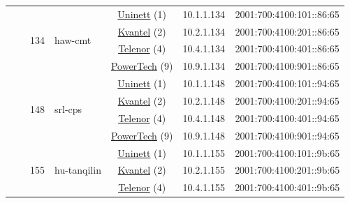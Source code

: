 \begin{small}
\begin{center}
\begin{longtable}{|c|c|c|c|c|c|c|c|}
  &  & \multirow{4}{*}{\tiny{134}} & \multicolumn{1}{|l|}{\multirow{4}{*}{\tiny{haw-cmt}}} & \multicolumn{2}{|c|}{\tiny{\href{https://www.uninett.no}{Uninett} (1)}} & \tiny{10.1.1.134} & \tiny{2001:700:4100:101::86:65} \\* \cline{5-5}\cline{6-6}\cline{7-7}\cline{8-8}
  &  &  &  & \multicolumn{2}{|c|}{\tiny{\href{http://kvantel.no}{Kvantel} (2)}} & \tiny{10.2.1.134} & \tiny{2001:700:4100:201::86:65} \\* \cline{5-5}\cline{6-6}\cline{7-7}\cline{8-8}
  &  &  &  & \multicolumn{2}{|c|}{\tiny{\href{https://www.telenor.no}{Telenor} (4)}} & \tiny{10.4.1.134} & \tiny{2001:700:4100:401::86:65} \\* \cline{5-5}\cline{6-6}\cline{7-7}\cline{8-8}
  &  &  &  & \multicolumn{2}{|c|}{\tiny{\href{http://www.powertech.no}{PowerTech} (9)}} & \tiny{10.9.1.134} & \tiny{2001:700:4100:901::86:65} \\* \cline{3-3}\cline{4-4}\cline{5-5}\cline{6-6}\cline{7-7}\cline{8-8}
  &  & \multirow{4}{*}{\tiny{148}} & \multicolumn{1}{|l|}{\multirow{4}{*}{\tiny{srl-cps}}} & \multicolumn{2}{|c|}{\tiny{\href{https://www.uninett.no}{Uninett} (1)}} & \tiny{10.1.1.148} & \tiny{2001:700:4100:101::94:65} \\* \cline{5-5}\cline{6-6}\cline{7-7}\cline{8-8}
  &  &  &  & \multicolumn{2}{|c|}{\tiny{\href{http://kvantel.no}{Kvantel} (2)}} & \tiny{10.2.1.148} & \tiny{2001:700:4100:201::94:65} \\* \cline{5-5}\cline{6-6}\cline{7-7}\cline{8-8}
  &  &  &  & \multicolumn{2}{|c|}{\tiny{\href{https://www.telenor.no}{Telenor} (4)}} & \tiny{10.4.1.148} & \tiny{2001:700:4100:401::94:65} \\* \cline{5-5}\cline{6-6}\cline{7-7}\cline{8-8}
  &  &  &  & \multicolumn{2}{|c|}{\tiny{\href{http://www.powertech.no}{PowerTech} (9)}} & \tiny{10.9.1.148} & \tiny{2001:700:4100:901::94:65} \\* \cline{3-3}\cline{4-4}\cline{5-5}\cline{6-6}\cline{7-7}\cline{8-8}
  &  & \multirow{4}{*}{\tiny{155}} & \multicolumn{1}{|l|}{\multirow{4}{*}{\tiny{hu-tanqilin}}} & \multicolumn{2}{|c|}{\tiny{\href{https://www.uninett.no}{Uninett} (1)}} & \tiny{10.1.1.155} & \tiny{2001:700:4100:101::9b:65} \\* \cline{5-5}\cline{6-6}\cline{7-7}\cline{8-8}
  &  &  &  & \multicolumn{2}{|c|}{\tiny{\href{http://kvantel.no}{Kvantel} (2)}} & \tiny{10.2.1.155} & \tiny{2001:700:4100:201::9b:65} \\* \cline{5-5}\cline{6-6}\cline{7-7}\cline{8-8}
  &  &  &  & \multicolumn{2}{|c|}{\tiny{\href{https://www.telenor.no}{Telenor} (4)}} & \tiny{10.4.1.155} & \tiny{2001:700:4100:401::9b:65} \\* \cline{5-5}\cline{6-6}\cline{7-7}\cline{8-8}

\end{longtable}
\end{center}
\end{small}
